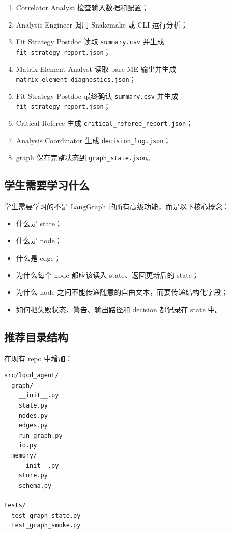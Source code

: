 \documentclass[11pt,a4paper,fontset=none]{ctexart}
\begin{document}
\begin{enumerate}[leftmargin=2em]
  \item Correlator Analyst 检查输入数据和配置；
  \item Analysis Engineer 调用 Snakemake 或 CLI 运行分析；
  \item Fit Strategy Postdoc 读取 \texttt{summary.csv} 并生成 \texttt{fit\_strategy\_report.json}；
  \item Matrix Element Analyst 读取 bare ME 输出并生成 \texttt{matrix\_element\_diagnostics.json}；
  \item Fit Strategy Postdoc 最终确认 \texttt{summary.csv} 并生成 \texttt{fit\_strategy\_report.json}；
  \item Critical Referee 生成 \texttt{critical\_referee\_report.json}；
  \item Analysis Coordinator 生成 \texttt{decision\_log.json}；
  \item graph 保存完整状态到 \texttt{graph\_state.json}。
\end{enumerate}

\subsection{学生需要学习什么}

学生需要学习的不是 LangGraph 的所有高级功能，而是以下核心概念：

\begin{itemize}[leftmargin=2em]
  \item 什么是 state；
  \item 什么是 node；
  \item 什么是 edge；
  \item 为什么每个 node 都应该读入 state、返回更新后的 state；
  \item 为什么 node 之间不能传递随意的自由文本，而要传递结构化字段；
  \item 如何把失败状态、警告、输出路径和 decision 都记录在 state 中。
\end{itemize}

\subsection{推荐目录结构}

在现有 repo 中增加：

\begin{lstlisting}
src/lqcd_agent/
  graph/
    __init__.py
    state.py
    nodes.py
    edges.py
    run_graph.py
    io.py
  memory/
    __init__.py
    store.py
    schema.py

tests/
  test_graph_state.py
  test_graph_smoke.py
\end{lstlisting}
\end{document}
